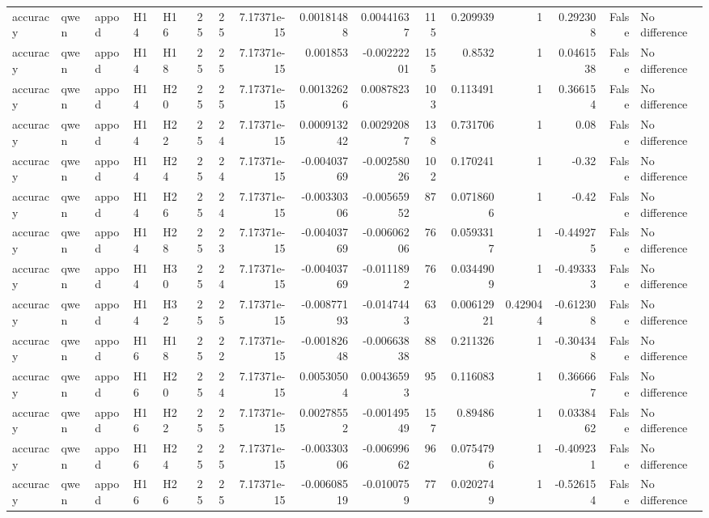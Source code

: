 \begin{longtable}{lllllrrrrrrrrrrl}
accuracy & qwen & appod & H14 & H16 & 25 & 25 & 7.17371e-15 & 0.00181488 & 0.00441637 & 115 & 0.209939 & 1 & 0.292308 & False & No difference \\
accuracy & qwen & appod & H14 & H18 & 25 & 25 & 7.17371e-15 & 0.001853 & -0.00222201 & 155 & 0.8532 & 1 & 0.0461538 & False & No difference \\
accuracy & qwen & appod & H14 & H20 & 25 & 25 & 7.17371e-15 & 0.00132626 & 0.0087823 & 103 & 0.113491 & 1 & 0.366154 & False & No difference \\
accuracy & qwen & appod & H14 & H22 & 25 & 24 & 7.17371e-15 & 0.000913242 & 0.00292087 & 138 & 0.731706 & 1 & 0.08 & False & No difference \\
accuracy & qwen & appod & H14 & H24 & 25 & 24 & 7.17371e-15 & -0.00403769 & -0.00258026 & 102 & 0.170241 & 1 & -0.32 & False & No difference \\
accuracy & qwen & appod & H14 & H26 & 25 & 24 & 7.17371e-15 & -0.00330306 & -0.00565952 & 87 & 0.0718606 & 1 & -0.42 & False & No difference \\
accuracy & qwen & appod & H14 & H28 & 25 & 23 & 7.17371e-15 & -0.00403769 & -0.00606206 & 76 & 0.0593317 & 1 & -0.449275 & False & No difference \\
accuracy & qwen & appod & H14 & H30 & 25 & 24 & 7.17371e-15 & -0.00403769 & -0.0111892 & 76 & 0.0344909 & 1 & -0.493333 & False & No difference \\
accuracy & qwen & appod & H14 & H32 & 25 & 25 & 7.17371e-15 & -0.00877193 & -0.0147443 & 63 & 0.00612921 & 0.429044 & -0.612308 & False & No difference \\
accuracy & qwen & appod & H16 & H18 & 25 & 22 & 7.17371e-15 & -0.00182648 & -0.00663838 & 88 & 0.211326 & 1 & -0.304348 & False & No difference \\
accuracy & qwen & appod & H16 & H20 & 25 & 24 & 7.17371e-15 & 0.00530504 & 0.00436593 & 95 & 0.116083 & 1 & 0.366667 & False & No difference \\
accuracy & qwen & appod & H16 & H22 & 25 & 25 & 7.17371e-15 & 0.00278552 & -0.00149549 & 157 & 0.89486 & 1 & 0.0338462 & False & No difference \\
accuracy & qwen & appod & H16 & H24 & 25 & 25 & 7.17371e-15 & -0.00330306 & -0.00699662 & 96 & 0.0754796 & 1 & -0.409231 & False & No difference \\
accuracy & qwen & appod & H16 & H26 & 25 & 25 & 7.17371e-15 & -0.00608519 & -0.0100759 & 77 & 0.0202749 & 1 & -0.526154 & False & No difference \\

\end{longtable}
